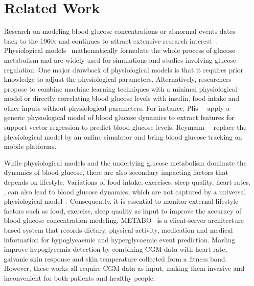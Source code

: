 \section{Related Work}
\label{sec:relwork}
Research on modeling blood glucose concentrations or abnormal events dates back to the 1960s and continues to attract extensive research interest~\cite{bib:IJNMBE16:Oviedo}.
Physiological models~\cite{bib:TBE07:Dalla, bib:PE04:Hovorka} mathematically formulate the whole process of glucose metabolism and are widely used for simulations and studies involving glucose regulation.
One major drawback of physiological models is that it requires prior knowledge to adjust the physiological parameters.
Alternatively, researchers propose to combine machine learning techniques with a minimal physiological model or directly correlating blood glucose levels with insulin, food intake and other inputs without physiological parameters.
For instance, Plis~\etal~\cite{bib:MAIHA14:Plis} apply a generic physiological model of blood glucose dynamics to extract features for support vector regression to predict blood glucose levels.
Reymann~\etal~\cite{bib:EMBC16:Reymann} replace the physiological model by an online simulator and bring blood glucose tracking on mobile platforms.

While physiological models and the underlying glucose metabolism dominate the dynamics of blood glucose, there are also secondary impacting factors that depends on lifestyle.
Variations of food intake, exercises, sleep quality, heart rates, \etc, can also lead to blood glucose dynamics, which are not captured by a universal physiological model~\cite{bib:DRCP15:Iwasaki}.
Consequently, it is essential to monitor external lifestyle factors such as food, exercise, sleep quality as input to improve the accuracy of blood glucose concentration modeling.
METABO~\cite{bib:EMBC09:Georga} is a client-server architecture based system that records dietary, physical activity, medication and medical information for hypoglycaemic and hyperglycaemic event prediction.
Marling~\etal~\cite{bib:KDHealth16:Marling} improve hypoglycemia detection by combining CGM data with heart rate, galvanic skin response and skin temperature collected from a fitness band.
However, these works all require CGM data as input, making them invasive and inconvenient for both patients and healthy people.

